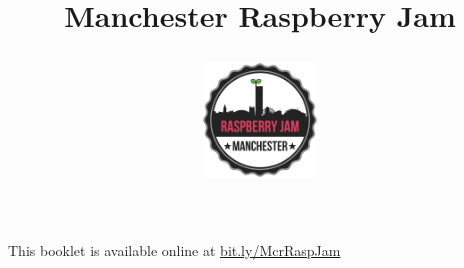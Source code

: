 \ifprint
	\title{Manchester Raspberry Jam \\ \workshopTitle}
\else
	\title{
		\begin{center}
			\includegraphics[width=30mm]{McrRaspJam/Common/logo-512}
		\end{center}
		\vspace{12pt}
		\workshopTitle
	}
\fi

	
\author{}
\date{\vspace{-44pt}}
\maketitle


\ifprint
	\begin{mdframed}[rightline=false, leftline=false]
		\scriptsize
		This booklet is available online at \mbox{\href{https://drive.google.com/open?id=0B_1SFjX_5JrmfnhpX0pPRXl6bmJNal8zdUxMeWZOdjJyZVdzU3V6UnBGdlVIMENtbFFkbVk}{bit.ly/McrRaspJam}}
		\normalsize
	\end{mdframed}
\fi